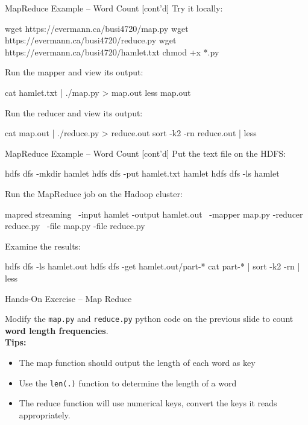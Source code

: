 \documentclass[ignorenonframetext,xcolor=x11names]{beamer}
\begin{document}
\begin{frame}[fragile]{MapReduce Example -- Word Count \small [cont'd]}
Try it locally:
\begin{bashcode}
wget https://evermann.ca/busi4720/map.py
wget https://evermann.ca/busi4720/reduce.py
wget https://evermann.ca/busi4720/hamlet.txt
chmod +x *.py
\end{bashcode}
Run the mapper and view its output:
\begin{bashcode}
cat hamlet.txt | ./map.py > map.out
less map.out
\end{bashcode}
Run the reducer and view its output:
\begin{bashcode}
cat map.out | ./reduce.py > reduce.out
sort -k2 -rn reduce.out | less
\end{bashcode}
\end{frame}

\begin{frame}[fragile]{MapReduce Example -- Word Count \small [cont'd]}
Put the text file on the HDFS:
\begin{bashcode}
hdfs dfs -mkdir hamlet
hdfs dfs -put hamlet.txt hamlet
hdfs dfs -ls hamlet
\end{bashcode}
Run the MapReduce job on the Hadoop cluster:
\begin{bashcode}
mapred streaming \
  -input hamlet -output hamlet.out \
  -mapper map.py -reducer reduce.py \
  -file map.py -file reduce.py
\end{bashcode}
Examine the results:
\begin{bashcode}
hdfs dfs -ls hamlet.out
hdfs dfs -get hamlet.out/part-*
cat part-* | sort -k2 -rn | less
\end{bashcode}
\end{frame}

\begin{frame}{Hands-On Exercise -- Map Reduce}

Modify the \texttt{map.py} and \texttt{reduce.py} python code on the previous slide to count \textbf{word length frequencies}. \\

\vspace{\baselineskip}
\textbf{Tips:}
\begin{itemize}
   \item The map function should output the length of each word as key
   \item Use the \texttt{len(.)} function to determine the length of a word
   
   \item The reduce function will use numerical keys, convert the keys it reads appropriately.
\end{itemize}
\end{frame}
\end{document}
